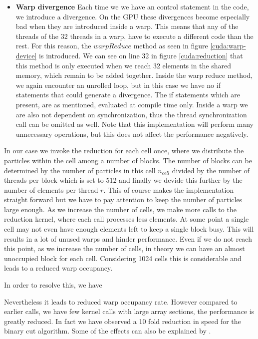\documentclass[]{article}
\begin{document}
\begin{itemize}
	\item \textbf{Warp divergence} Each time we we have an control statement in the code, we introduce a divergence. On the GPU these divergences become especially bad when they are introduced inside a warp. This means that any of the threads of the 32 threads in a warp, have to execute a different code than the rest. For this reason, the $warpReduce$ method as seen in figure \ref{cuda:warp-device} is introduced. We can see on line 32 in figure \ref{cuda:reduction} that this method is only executed when we reach 32 elements in the shared memory, which remain to be added together. Inside the warp reduce method, we again encounter an unrolled loop, but in this case we have no if statements that could generate a divergence. The if statements which are present, are as mentioned, evaluated at compile time only. Inside a warp we are also not dependent on synchronization, thus the thread synchronization call can be omitted as well. Note that this implementation will perform many unnecessary operations, but this does not affect the performance negatively.
	
\end{itemize}

In our case we invoke the reduction for each cell once, where we distribute the particles within the cell among a number of blocks. The number of blocks can be determined by the number of particles in this cell $n_{cell}$ divided by the number of threads per block which is set to 512 and finally we devide this further by the number of elements per thread $r$. This of course makes the implementation straight forward but we have to pay attention to keep the number of particles large enough. As we increase the number of cells, we make more calls to the reduction kernel, where each call processes less elements. At some point a single cell may not even have enough elements left to keep a single block busy. This will results in a lot of unused warps and hinder performance. Even if we do not reach this point, as we increase the number of cells, in theory we can have an almost unoccupied block for each cell. Considering 1024 cells this is considerable and leads to a reduced warp occupancy. 

In order to resolve this, we have 

  Nevertheless it leads to reduced warp occupancy rate. However compared to earlier calls, we have few kernel calls with large array sections, the performance is greatly reduced. In fact we have observed a 10 fold reduction in speed for the binary cut algorithm. Some of the effects can also be explained by  .
\end{document}
